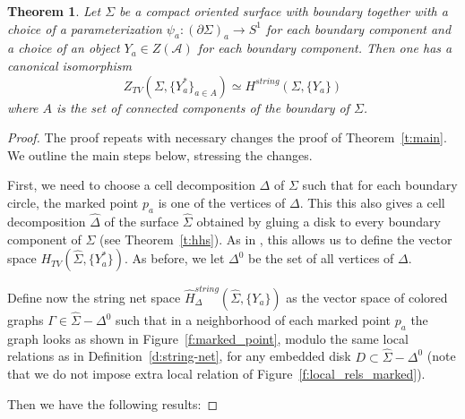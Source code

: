 \documentclass{amsart}
\newtheorem{theorem}{Theorem}[section]
\theoremstyle{definition}
\theoremstyle{remark}
\numberwithin{equation}{section}
\newcommand{\firef}[1]{Figure~{\rm\ref{#1}}}
\newcommand{\thref}[1]{Theorem~{\rm\ref{#1}}}
\newcommand{\deref}[1]{Definition~{\rm\ref{#1}}}
\newcommand{\del}{\partial}
\newcommand{\<}{\langle}
\renewcommand{\>}{\rangle}
\newcommand{\DD}{\mathcal{D}}      %
\newcommand{\A}{\mathcal{A}}      %
\newcommand{\Ga}{\Gamma}
\newcommand{\De}{\Delta}
\newcommand{\Si}{\Sigma}
\newcommand{\Sihat}{\widehat{\Sigma}}
\newcommand{\Hs}{H^{string}}
\newcommand{\HhsD}{\hat{H}^{string}_\De}
\newcommand{\HTV}{H_{TV}}
\begin{document}
\begin{theorem}\label{t:main2}
Let $\Si$ be a compact oriented  surface  with boundary together with a
choice of a parameterization $\psi_a\colon (\del \Si)_a\to S^1$ for  each
boundary component and a choice of an object $Y_a\in Z(\A)$ for each
boundary component. Then one has a canonical isomorphism  
$$
Z_{TV}(\Si, \{Y^*_a\}_{a\in A})\simeq \Hs(\Si, \{Y_a\})
$$
where $A$ is the set of connected components of the boundary of $\Si$.
\end{theorem}
\begin{proof}

The proof repeats with necessary changes the proof of \thref{t:main}. We
outline the main steps below, stressing the changes. 

First, we need to choose a cell decomposition $\De$ of $\Si$ such that for
each boundary circle, the marked point $p_a$ is one of the vertices of
$\De$. This  this also gives a cell decomposition $\hat \De$ of the surface
$\Sihat$ obtained by gluing a disk to every boundary component of $\Si$
(see \thref{t:hhs}). As in , this allows us to
define the vector space $\HTV(\Sihat, \{Y^*_a\})$. As before, we let
$\De^0$ be the set of all vertices of $\De$.  





Define now the string net space $\HhsD(\Sihat, \{Y_a\})$ as the vector
space of colored graphs $\Ga\in \Sihat-\De^0$ such that in  a neighborhood
of each marked point $p_a$ the graph looks as  shown in
\firef{f:marked_point},  modulo the same local relations as in
\deref{d:string-net}, for any embedded disk $D\subset \Sihat-\De^0$ (note
that we do not impose extra local relation  of
\firef{f:local_rels_marked}). 

Then we have the following results:

\end{proof}
\end{document}
